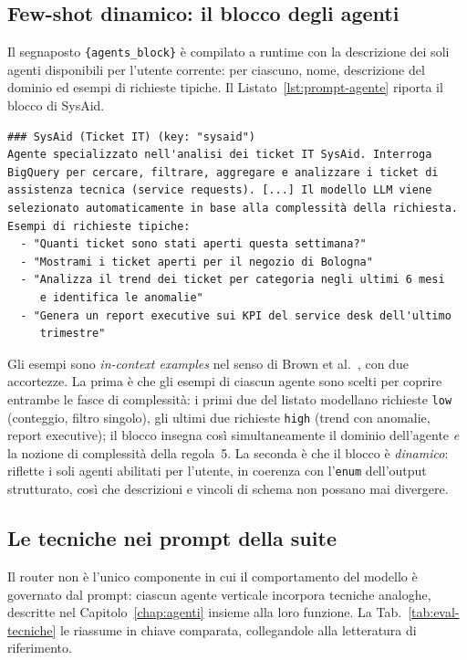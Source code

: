 \subsection{Few-shot dinamico: il blocco degli agenti}
\label{subsec:eval-prompt-fewshot}

Il segnaposto \texttt{\{agents\_block\}} è compilato a runtime con la
descrizione dei soli agenti disponibili per l'utente corrente: per ciascuno,
nome, descrizione del dominio ed esempi di richieste tipiche. Il
Listato~\ref{lst:prompt-agente} riporta il blocco di SysAid.

\begin{lstlisting}[caption={Estratto del system prompt del router (v1.0): il blocco descrittivo di SysAid generato a runtime, con gli esempi few-shot.},label={lst:prompt-agente}]
### SysAid (Ticket IT) (key: "sysaid")
Agente specializzato nell'analisi dei ticket IT SysAid. Interroga
BigQuery per cercare, filtrare, aggregare e analizzare i ticket di
assistenza tecnica (service requests). [...] Il modello LLM viene
selezionato automaticamente in base alla complessità della richiesta.
Esempi di richieste tipiche:
  - "Quanti ticket sono stati aperti questa settimana?"
  - "Mostrami i ticket aperti per il negozio di Bologna"
  - "Analizza il trend dei ticket per categoria negli ultimi 6 mesi
     e identifica le anomalie"
  - "Genera un report executive sui KPI del service desk dell'ultimo
     trimestre"
\end{lstlisting}

Gli esempi sono \emph{in-context examples} nel senso di
Brown et al.~\cite{brown2020gpt3}, con due accortezze. La prima è che gli
esempi di ciascun agente sono scelti per coprire entrambe le fasce di
complessità: i primi due del listato modellano richieste \texttt{low}
(conteggio, filtro singolo), gli ultimi due richieste \texttt{high}
(trend con anomalie, report executive); il blocco insegna così
simultaneamente il dominio dell'agente \emph{e} la nozione di complessità
della regola~5. La seconda è che il blocco è \emph{dinamico}: riflette i
soli agenti abilitati per l'utente, in coerenza con l'\texttt{enum}
dell'output strutturato, così che descrizioni e vincoli di schema non
possano mai divergere.

\subsection{Le tecniche nei prompt della suite}
\label{subsec:eval-prompt-tecniche}

Il router non è l'unico componente in cui il comportamento del modello è
governato dal prompt: ciascun agente verticale incorpora tecniche analoghe,
descritte nel Capitolo~\ref{chap:agenti} insieme alla loro funzione. La
Tab.~\ref{tab:eval-tecniche} le riassume in chiave comparata, collegandole
alla letteratura di riferimento.

